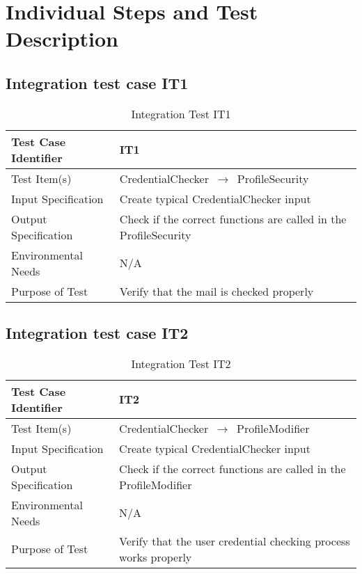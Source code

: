 \documentclass[../../testPlan.tex]{subfiles}
\begin{document}
	\chapter{Individual Steps and Test Description}
		
		
	\section{Integration test case IT1}
		\begin{table}[H]
			\centering
			\label{IT1}
			\begin{tabular}{ll}
				\hline
				Test Case Identifier & IT1  \\ \hline
				Test Item(s)         & CredentialChecker $\,\to\,$ ProfileSecurity\\ \hline
				Input Specification  & Create typical CredentialChecker input  \\ \hline
				Output Specification & Check if the correct functions are called in the ProfileSecurity\\ \hline
				Environmental Needs  &  N/A \\ \hline
				Purpose of Test      &  Verify that the mail is checked properly\\ \hline
			\end{tabular}
			\caption{Integration Test IT1}
		\end{table}
		
		
	\section{Integration test case IT2}
		\begin{table}[H]
			\centering
			\label{IT2}
			\begin{tabular}{ll}
				\hline
				Test Case Identifier & IT2  \\ \hline
				Test Item(s)         & CredentialChecker $\,\to\,$ ProfileModifier\\ \hline
				Input Specification  & Create typical CredentialChecker input  \\ \hline
				Output Specification & Check if the correct functions are called in the ProfileModifier\\ \hline
				Environmental Needs  &  N/A \\ \hline
				Purpose of Test      &  Verify that the user credential checking process works properly\\ \hline
			\end{tabular}
			\caption{Integration Test IT2}
		\end{table}
		
\end{document}
